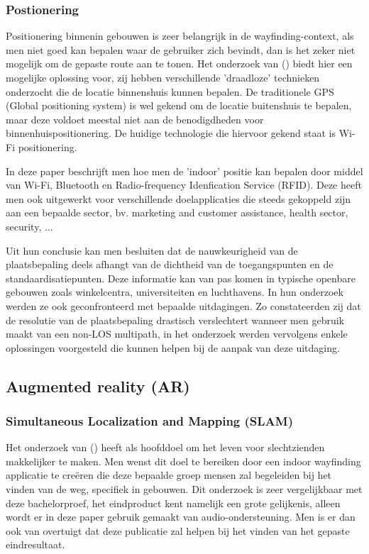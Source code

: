 \subsubsection{Postionering}
Positionering binnenin gebouwen is zeer belangrijk in de wayfinding-context, als men niet goed kan bepalen waar de gebruiker zich bevindt, dan is het zeker niet mogelijk om de gepaste route aan te tonen. Het onderzoek van \textcite{Hasan2019} () biedt hier een mogelijke oplossing voor, zij hebben verschillende 'draadloze' technieken onderzocht die de locatie binnenshuis kunnen bepalen. De traditionele GPS (Global positioning system) is wel gekend om de locatie buitenshuis te bepalen, maar deze voldoet meestal niet aan de benodigdheden voor binnenhuispositionering. De huidige technologie die hiervoor gekend staat is Wi-Fi positionering.

In deze paper beschrijft men hoe men de 'indoor' positie kan bepalen door middel van Wi-Fi, Bluetooth en Radio-frequency Idenfication Service (RFID). Deze heeft men ook uitgewerkt voor verschillende doelapplicaties die steeds gekoppeld zijn aan een bepaalde sector, bv. marketing and customer assistance, health sector, security, ...

Uit hun conclusie kan men besluiten dat de nauwkeurigheid van de plaatsbepaling deels afhangt van de dichtheid van de toegangspunten en de standaardisatiepunten. Deze informatie kan van pas komen in typische openbare gebouwen zoals winkelcentra, universiteiten en luchthavens. In hun onderzoek werden ze ook geconfronteerd met bepaalde uitdagingen. Zo constateerden zij dat de resolutie van de plaatsbepaling drastisch verslechtert wanneer men gebruik maakt van een non-LOS multipath, in het onderzoek werden vervolgens enkele oplossingen voorgesteld die kunnen helpen bij de aanpak van deze uitdaging.
 

\subsection{Augmented reality (AR)}

\subsubsection{Simultaneous Localization and Mapping (SLAM)}
Het onderzoek van \textcite{Zhang2017} () heeft als hoofddoel om het leven voor slechtzienden makkelijker te maken. Men wenst dit doel te bereiken door een indoor wayfinding applicatie te creëren die deze bepaalde groep mensen zal begeleiden bij het vinden van de weg, specifiek in gebouwen. Dit onderzoek is zeer vergelijkbaar met deze bachelorproef, het eindproduct kent namelijk een grote gelijkenis, alleen wordt er in deze paper gebruik gemaakt van audio-ondersteuning. Men is er dan ook van overtuigt dat deze publicatie zal helpen bij het vinden van het gepaste eindresultaat.

